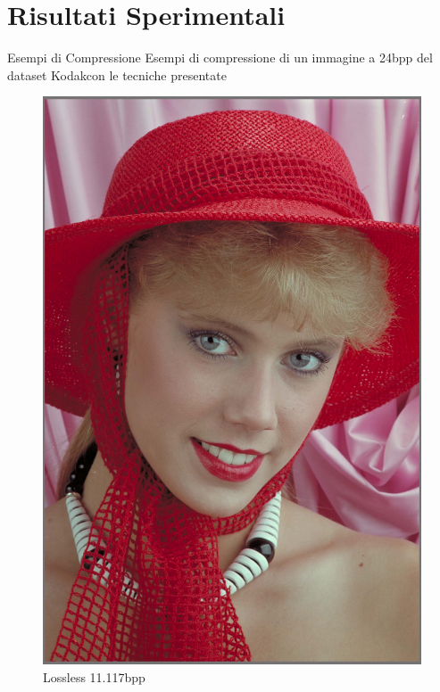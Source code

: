 \section{Risultati Sperimentali}

    \begin{frame}{Esempi di Compressione}
        Esempi di compressione di un immagine a 24bpp del dataset Kodak\footnotemark[1] con le tecniche presentate\\
        \begin{figure}[!ht]
            \begin{minipage}[]{0.13\linewidth}
                \centering
                \includegraphics[width=\textwidth]{Immagini/IMAGES/PNG_IMG0004.pdf}
                \caption{Lossless 11.117bpp}
                \label{fig:Lossless}

\end{minipage}
\end{figure}
\end{frame}
